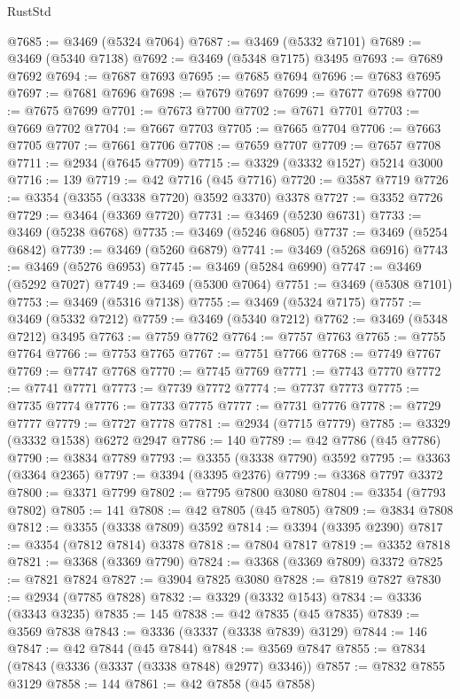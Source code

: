 \begin{lexlean}{RustStd}
\begin{coremodule}
@7685 := @3469 (@5324 @7064)
@7687 := @3469 (@5332 @7101)
@7689 := @3469 (@5340 @7138)
@7692 := @3469 (@5348 @7175) @3495
@7693 := @7689 @7692
@7694 := @7687 @7693
@7695 := @7685 @7694
@7696 := @7683 @7695
@7697 := @7681 @7696
@7698 := @7679 @7697
@7699 := @7677 @7698
@7700 := @7675 @7699
@7701 := @7673 @7700
@7702 := @7671 @7701
@7703 := @7669 @7702
@7704 := @7667 @7703
@7705 := @7665 @7704
@7706 := @7663 @7705
@7707 := @7661 @7706
@7708 := @7659 @7707
@7709 := @7657 @7708
@7711 := @2934 (@7645 @7709)
@7715 := @3329 (@3332 @1527) @5214 @3000
@7716 := 139
@7719 := @42 @7716 (@45 @7716)
@7720 := @3587 @7719
@7726 := @3354 (@3355 (@3338 @7720) @3592 @3370) @3378
@7727 := @3352 @7726
@7729 := @3464 (@3369 @7720)
@7731 := @3469 (@5230 @6731)
@7733 := @3469 (@5238 @6768)
@7735 := @3469 (@5246 @6805)
@7737 := @3469 (@5254 @6842)
@7739 := @3469 (@5260 @6879)
@7741 := @3469 (@5268 @6916)
@7743 := @3469 (@5276 @6953)
@7745 := @3469 (@5284 @6990)
@7747 := @3469 (@5292 @7027)
@7749 := @3469 (@5300 @7064)
@7751 := @3469 (@5308 @7101)
@7753 := @3469 (@5316 @7138)
@7755 := @3469 (@5324 @7175)
@7757 := @3469 (@5332 @7212)
@7759 := @3469 (@5340 @7212)
@7762 := @3469 (@5348 @7212) @3495
@7763 := @7759 @7762
@7764 := @7757 @7763
@7765 := @7755 @7764
@7766 := @7753 @7765
@7767 := @7751 @7766
@7768 := @7749 @7767
@7769 := @7747 @7768
@7770 := @7745 @7769
@7771 := @7743 @7770
@7772 := @7741 @7771
@7773 := @7739 @7772
@7774 := @7737 @7773
@7775 := @7735 @7774
@7776 := @7733 @7775
@7777 := @7731 @7776
@7778 := @7729 @7777
@7779 := @7727 @7778
@7781 := @2934 (@7715 @7779)
@7785 := @3329 (@3332 @1538) @6272 @2947
@7786 := 140
@7789 := @42 @7786 (@45 @7786)
@7790 := @3834 @7789
@7793 := @3355 (@3338 @7790) @3592
@7795 := @3363 (@3364 @2365)
@7797 := @3394 (@3395 @2376)
@7799 := @3368 @7797 @3372
@7800 := @3371 @7799
@7802 := @7795 @7800 @3080
@7804 := @3354 (@7793 @7802)
@7805 := 141
@7808 := @42 @7805 (@45 @7805)
@7809 := @3834 @7808
@7812 := @3355 (@3338 @7809) @3592
@7814 := @3394 (@3395 @2390)
@7817 := @3354 (@7812 @7814) @3378
@7818 := @7804 @7817
@7819 := @3352 @7818
@7821 := @3368 (@3369 @7790)
@7824 := @3368 (@3369 @7809) @3372
@7825 := @7821 @7824
@7827 := @3904 @7825 @3080
@7828 := @7819 @7827
@7830 := @2934 (@7785 @7828)
@7832 := @3329 (@3332 @1543)
@7834 := @3336 (@3343 @3235)
@7835 := 145
@7838 := @42 @7835 (@45 @7835)
@7839 := @3569 @7838
@7843 := @3336 (@3337 (@3338 @7839) @3129)
@7844 := 146
@7847 := @42 @7844 (@45 @7844)
@7848 := @3569 @7847
@7855 := @7834 (@7843 (@3336 (@3337 (@3338 @7848) @2977) @3346))
@7857 := @7832 @7855 @3129
@7858 := 144
@7861 := @42 @7858 (@45 @7858)

\end{coremodule}
\end{lexlean}
